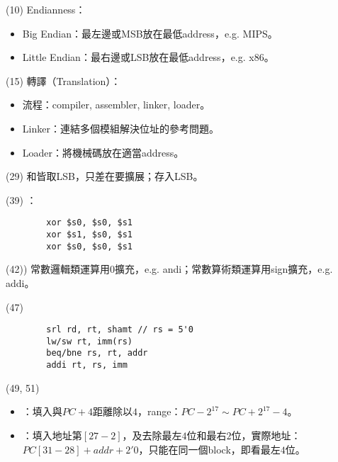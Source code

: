 \item \begin{theorem}{(10)} Endianness：\begin{itemize}
        \item Big Endian：最左邊或MSB放在最低address，e.g. MIPS。
        \item Little Endian：最右邊或LSB放在最低address，e.g. x86。
    \end{itemize}
\end{theorem}

\item \begin{theorem}{(15)} 轉譯（Translation）：\begin{itemize}
        \item 流程：compiler, assembler, linker, loader。
        \item Linker：連結多個模組解決位址的參考問題。
        \item Loader：將機械碼放在適當address。
    \end{itemize}
\end{theorem}

\item \begin{theorem}{(29)} 和皆取LSB，只差在要擴展；存入LSB。
\end{theorem}

\item \begin{theorem}{(39)} ： \begin{lstlisting}
        xor $s0, $s0, $s1
        xor $s1, $s0, $s1
        xor $s0, $s0, $s1
    \end{lstlisting}
\end{theorem}

\item \begin{theorem}{(42))} 常數邏輯類運算用$0$擴充，e.g. andi；常數算術類運算用sign擴充，e.g. addi。
\end{theorem}

\item \begin{theorem}{(47)} \quad\quad \begin{lstlisting}
        srl rd, rt, shamt // rs = 5'0
        lw/sw rt, imm(rs)
        beq/bne rs, rt, addr
        addi rt, rs, imm
    \end{lstlisting}
\end{theorem}

\item \begin{theorem}{(49, 51)} \quad\quad \begin{itemize}
        \item {}：填入與$PC + 4$距離除以$4$，range：$PC - 2^{17} \sim PC + 2^{17} - 4$。
        \item {}：填入地址第$[27 - 2]$，及去除最左$4$位和最右$2$位，實際地址：$PC[31 - 28] + addr + 2'0$，只能在同一個block，即看最左$4$位。
    \end{itemize}
\end{theorem}
